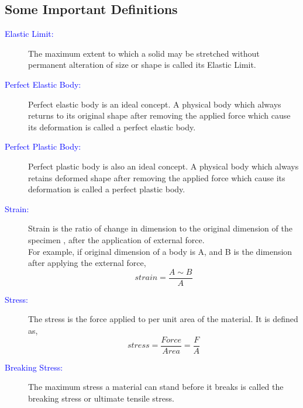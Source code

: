 \documentclass{article}
\begin{document}
    \subsection{Some Important Definitions}

        \begin{description}

            \item[\textcolor{blue}{Elastic Limit:}]    
                The maximum extent to which a solid may be stretched without permanent alteration of size or shape is called its Elastic Limit.
            
            \item[\textcolor{blue}{Perfect Elastic Body:}]    
                Perfect elastic body is an ideal concept. A physical body which always returns to its original shape after removing the applied force which cause its deformation is called a perfect elastic body.

            \item[\textcolor{blue}{Perfect Plastic Body:}]    
                Perfect plastic body is also an ideal concept. A physical body which always retains deformed shape after removing the applied force which cause its deformation is called a perfect plastic body.
            
            \item[\textcolor{blue}{Strain:}]  
                Strain is the ratio of change in dimension to the original dimension of the specimen , after the application of external force. \\
                For example, if original dimension of a body is A, and B is the dimension after applying the external force,
                \begin{equation}
                    strain = \frac{A \sim B}{A}
                    \label{subsec:strain}
                \end{equation}
                
            \item[\textcolor{blue}{Stress:}]  
                The stress is the force applied to per unit area of the material. It is defined as,
                \begin{equation}
                    stress = \frac{Force}{Area} = \frac{F}{A}
                    \label{subsec:stress}
                \end{equation}
            
            \item[\textcolor{blue}{Breaking Stress:}] 
                The maximum stress a material can stand before it breaks is called the breaking stress or ultimate tensile stress.
            
            \end{description}
\end{document}

